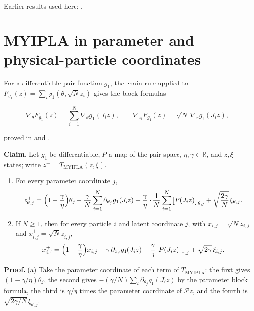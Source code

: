 \documentclass[11pt,a4paper]{article}
\begin{document}
Earlier results used here: \cite[Section~3.1.1]{LangevinLean2026IPLA}.

\section{\texorpdfstring{MYIPLA in parameter and physical-particle coordinates}{MYIPLA in parameter and physical-particle coordinates}}


For a differentiable pair function \(g_1\), the chain rule applied to \(F_{g_1}(z)=\sum_ig_1(\theta,\sqrt Nz_i)\) gives the block formulas


\[\nabla_\theta F_{g_1}(z)=\sum_{i=1}^N\nabla_\theta g_1(J_iz),\qquad\nabla_{z_i}F_{g_1}(z)=\sqrt N\,\nabla_xg_1(J_iz),\]


proved in \cite[Section~3.1.5]{LangevinLean2026IPLA} and \cite[Section~3.1.5]{LangevinLean2026IPLA}.




\textbf{Claim.} Let \(g_1\) be differentiable, \(P\) a map of the pair space, \(\eta,\gamma\in\mathbb R\), and \(z,\xi\) states; write \(z^+=T_{\mathrm{MYIPLA}}(z,\xi)\).



\begin{enumerate}


\item For every parameter coordinate \(j\),
\[z^+_{\theta,j}=\Bigl(1-\frac\gamma\eta\Bigr)\theta_j-\frac\gamma N\sum_{i=1}^N\partial_{\theta_j}g_1(J_iz)+\frac\gamma\eta\cdot\frac1N\sum_{i=1}^N\bigl[P(J_iz)\bigr]_{\theta,j}+\sqrt{\frac{2\gamma}N}\,\xi_{\theta,j}.\]

\item If \(N\ge1\), then for every particle \(i\) and latent coordinate \(j\), with \(x_{i,j}=\sqrt Nz_{i,j}\) and \(x^+_{i,j}=\sqrt Nz^+_{i,j}\),
\[x^+_{i,j}=\Bigl(1-\frac\gamma\eta\Bigr)x_{i,j}-\gamma\,\partial_{x_j}g_1(J_iz)+\frac\gamma\eta\bigl[P(J_iz)\bigr]_{x,j}+\sqrt{2\gamma}\,\xi_{i,j}.\]

\end{enumerate}



\textbf{Proof.} (a) Take the parameter coordinate of each term of \(T_{\mathrm{MYIPLA}}\): the first gives \((1-\gamma/\eta)\theta_j\), the second gives \(-(\gamma/N)\sum_i\partial_{\theta_j}g_1(J_iz)\) by the parameter block formula, the third is \(\gamma/\eta\) times the parameter coordinate of \(\mathcal Pz\), and the fourth is \(\sqrt{2\gamma/N}\,\xi_{\theta,j}\).
\end{document}
